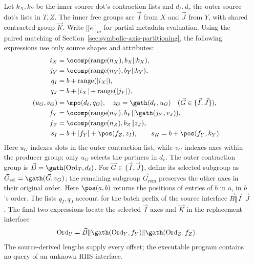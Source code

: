 Let $k_X,k_Y$ be the inner source dot's contraction lists and
$d_\ell,d_r$ the outer source dot's lists in $T,Z$. The inner free groups
are $\vec I$ from $X$ and $\vec J$ from $Y$, with shared contracted group
$\vec K$. Write $\lbrack\!\lbrack e\rbrack\!\rbrack_m$ for partial metadata
evaluation. Using the paired matching of
Section~\ref{sec:symbolic-axis-partitioning}, the following expressions
use only source shapes and attributes:
\begin{equation}
\begin{aligned}
 i_X&=\ocomp(\operatorname{range}(n_X),b_X\Vert k_X),\\
 j_Y&=\ocomp(\operatorname{range}(n_Y),b_Y\Vert k_Y),\\
 q_I&=b+\operatorname{range}(|i_X|),\\
 q_J&=b+|i_X|+\operatorname{range}(|j_Y|),\\
 (u_G,v_G)&=\mpo(d_\ell,q_G),\quad z_G=\gath(d_r,u_G)
                 \quad(\vec G\in\{\vec I,\vec J\}),\\
 f_Y&=\ocomp(\operatorname{range}(n_Y),
                      b_Y\Vert\gath(j_Y,v_J)),\\
 f_Z&=\ocomp(\operatorname{range}(n_Z),b_Z\Vert z_J),\\
 s_I&=b+|f_Y|+\pos(f_Z,z_I),\qquad
 s_K=b+\pos(f_Y,k_Y).
\end{aligned}
\label{eq:batched-program-locals}
\end{equation}
Here $u_G$ indexes slots in the outer contraction list, while $v_G$
indexes axes within the producer group; only $u_G$ selects the partners
in $d_r$. The outer contraction group is
$\vec D=\gath(\operatorname{Ord}_T,d_\ell)$.
For $\vec G\in\{\vec I,\vec J\}$, define its selected subgroup as
$\vec G_{\mathrm{sel}}=\gath(\vec G,v_G)$; the remaining subgroup
$\vec G_{\mathrm{rem}}$ preserves the other axes in their original order.
Here $\pos(a,b)$ returns the positions of entries of $b$ in $a$, in
$b$'s order. The lists $q_I,q_J$ account for the batch prefix of the source interface
$\vec B\Vert \vec I\Vert \vec J$. The final two expressions locate the selected $\vec I$
axes and $\vec K$ in the replacement interface
\begin{equation}
 \operatorname{Ord}_U=\vec B\Vert\gath(\operatorname{Ord}_Y,f_Y)
                  \Vert\gath(\operatorname{Ord}_Z,f_Z).
 \label{eq:batched-u-interface}
\end{equation}
The source-derived lengths supply every offset; the executable program
contains no query of an unknown RHS interface.

